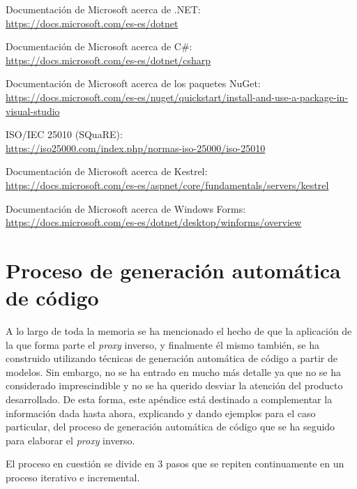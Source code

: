 \documentclass[11pt,spanish,listoffigures]{tfgetsinf}
\begin{document}
\begin{thebibliography}{10}
Documentación de Microsoft acerca de .NET:\\
\url{https://docs.microsoft.com/es-es/dotnet}

Documentación de Microsoft acerca de C\#:\\
\url{https://docs.microsoft.com/es-es/dotnet/csharp}

Documentación de Microsoft acerca de los paquetes NuGet:\\
\url{https://docs.microsoft.com/es-es/nuget/quickstart/install-and-use-a-package-in-visual-studio}

ISO/IEC 25010 (SQuaRE):\\
\url{https://iso25000.com/index.php/normas-iso-25000/iso-25010}

Documentación de Microsoft acerca de Kestrel:\\
\url{https://docs.microsoft.com/es-es/aspnet/core/fundamentals/servers/kestrel}

Documentación de Microsoft acerca de Windows Forms:\\
\url{https://docs.microsoft.com/es-es/dotnet/desktop/winforms/overview}

\end{thebibliography}


\APPENDIX

\chapter{Proceso de generación automática de código}

A lo largo de toda la memoria se ha mencionado el hecho de que la aplicación de la que forma parte el \emph{proxy} inverso, y finalmente él mismo también, se ha construido utilizando técnicas de generación automática de código a partir de modelos. Sin embargo, no se ha entrado en mucho más detalle ya que no se ha considerado imprescindible y no se ha querido desviar la atención del producto desarrollado. De esta forma, este apéndice está destinado a complementar la información dada hasta ahora, explicando y dando ejemplos para el caso particular, del proceso de generación automática de código que se ha seguido para elaborar el \emph{proxy} inverso.

El proceso en cuestión se divide en 3 pasos que se repiten continuamente en un proceso iterativo e incremental.
\end{document}
